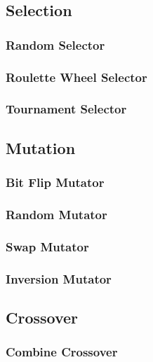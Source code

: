   \subsection{Selection}
  \label{sec:keen:operators:selection}
    \subsubsection{Random Selector}
    \label{sec:keen:operators:selection:random}
      \Blindtext
    \subsubsection{Roulette Wheel Selector}
    \label{sec:keen:operators:selection:roulette_wheel}
      \Blindtext
    \subsubsection{Tournament Selector}
    \label{sec:keen:operators:selection:tournament}
      \Blindtext
  \subsection{Mutation}
  \label{sec:keen:operators:mutation}
    \subsubsection{Bit Flip Mutator}
    \label{sec:keen:operators:mutation:bit_flip}
      \Blindtext
    \subsubsection{Random Mutator}
    \label{sec:keen:operators:mutation:simple}
      \Blindtext
    \subsubsection{Swap Mutator}
    \label{sec:keen:operators:mutation:swap}
      \Blindtext
    \subsubsection{Inversion Mutator}
    \label{sec:keen:operators:mutation:inversion}
      \Blindtext
  \subsection{Crossover}
  \label{sec:keen:operators:crossover}
    \subsubsection{Combine Crossover}
    \label{sec:keen:operators:crossover:combine}
      \Blindtext
